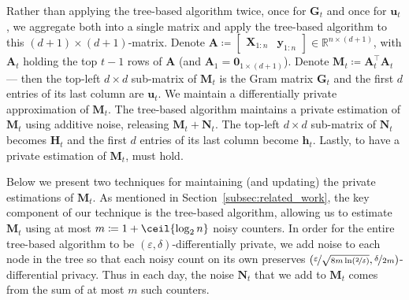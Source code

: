 \documentclass{article}
\renewcommand{\vec}[1]{\bm{#1}}
\newcommand{\defeq}{\coloneq}
\newcommand{\Real}{\mathds{R}}
\DeclarePairedDelimiter{\ceil}\lceil\rceil
\providecommand\transp{\top}
\let\transpsymbol\transp
\renewcommand{\transp}[1]{#1^\transpsymbol}
\newcommand{\XtX}[1]{\transp{#1}{#1}}
\begin{document}
Rather than applying the tree-based algorithm twice, once for $\vec G_t$ and once for $\vec u_t$, we aggregate both into a single matrix and apply the tree-based algorithm to this $(d+1)\times(d+1)$-matrix. Denote $\vec A \defeq \begin{bmatrix} \vec X_{1:n} & \vec y_{1:n} \end{bmatrix} \in
\Real^{n\times(d+1)}$, with $\vec A_t$ holding the top $t-1$ rows of $\vec A$
(and $\vec A_1 = \vec 0_{1\times(d+1)}$).  Denote $\vec M_t \defeq \XtX{\vec A_t}$
--- then the top-left $d\times d$ sub-matrix of $\vec M_t$ is the Gram
matrix $\vec G_t$ and the first $d$ entries of its last column are
$\vec u_t$. We maintain a differentially
private approximation of $\vec M_t$. The tree-based algorithm maintains a private estimation of $\vec M_t$ using additive noise, releasing $\vec M_t + \vec N_t$.  The
top-left $d\times d$ sub-matrix of $\vec N_t$ becomes $\vec H_t$ and the first
$d$ entries of its last column become $\vec h_t$. Lastly, to have a private estimation of $\vec M_t$,  must hold.

Below we present two techniques for maintaining (and updating) the
private estimations of $\vec M_t$. As mentioned in
Section~\ref{subsec:related_work}, the key component of our technique is
the tree-based algorithm, allowing us to estimate $\vec M_t$ using at most
$m \defeq 1 + \ceil{\log_2n}$ noisy counters. In order for the entire
tree-based algorithm to be $(\varepsilon,\delta)$-differentially
private, we add noise to each node in the tree so that each noisy
count on its own preserves
$(\nicefrac{\varepsilon}{\sqrt{8m\ln(\nicefrac{2}{\delta})}},
\nicefrac{\delta}{2m})$-differential privacy. Thus in each day, the
noise $\vec N_t$ that we add to $\vec M_t$ comes from the sum of at most $m$
such counters.


\end{document}
